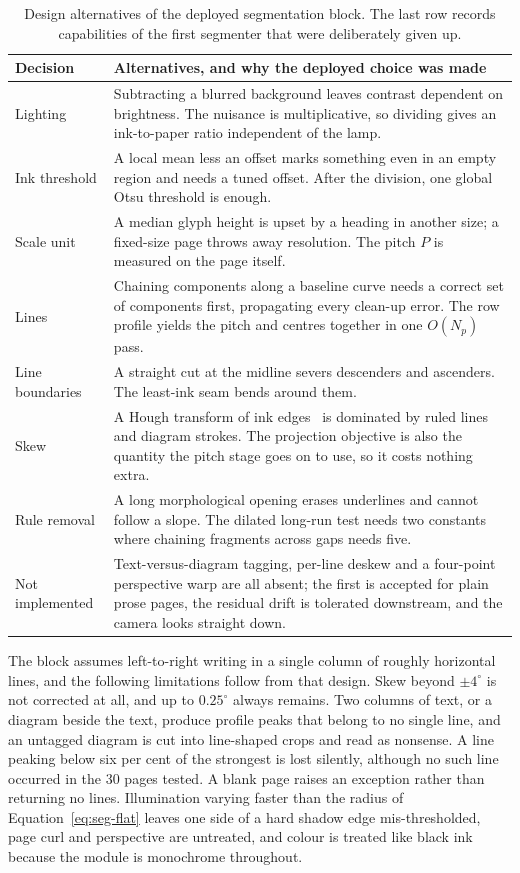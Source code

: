 \begin{table}[h]
\centering
\fontsize{8.5}{10.2}\selectfont
\setlength{\tabcolsep}{4pt}
\begin{tabularx}{\linewidth}{|p{2.4cm}|X|}
\hline
\textbf{Decision} & \textbf{Alternatives, and why the deployed choice was made} \\
\hline
Lighting & Subtracting a blurred background leaves contrast dependent on brightness. The nuisance is multiplicative, so dividing gives an ink-to-paper ratio independent of the lamp. \\
\hline
Ink threshold & A local mean less an offset marks something even in an empty region and needs a tuned offset. After the division, one global Otsu threshold is enough. \\
\hline
Scale unit & A median glyph height is upset by a heading in another size; a fixed-size page throws away resolution. The pitch $P$ is measured on the page itself. \\
\hline
Lines & Chaining components along a baseline curve needs a correct set of components first, propagating every clean-up error. The row profile yields the pitch and centres together in one $O(N_p)$ pass. \\
\hline
Line boundaries & A straight cut at the midline severs descenders and ascenders. The least-ink seam bends around them. \\
\hline
Skew & A Hough transform of ink edges~\cite{duda1972} is dominated by ruled lines and diagram strokes. The projection objective is also the quantity the pitch stage goes on to use, so it costs nothing extra. \\
\hline
Rule removal & A long morphological opening erases underlines and cannot follow a slope. The dilated long-run test needs two constants where chaining fragments across gaps needs five. \\
\hline
Not implemented & Text-versus-diagram tagging, per-line deskew and a four-point perspective warp are all absent; the first is accepted for plain prose pages, the residual drift is tolerated downstream, and the camera looks straight down. \\
\hline
\end{tabularx}
\caption{Design alternatives of the deployed segmentation block. The last row records capabilities of the first segmenter that were deliberately given up.}
\label{tab:seg-alt}
\end{table}

The block assumes left-to-right writing in a single column of roughly horizontal lines, and the following limitations follow from that design. Skew beyond $\pm4^\circ$ is not corrected at all, and up to $0.25^\circ$ always remains. Two columns of text, or a diagram beside the text, produce profile peaks that belong to no single line, and an untagged diagram is cut into line-shaped crops and read as nonsense. A line peaking below six per cent of the strongest is lost silently, although no such line occurred in the 30 pages tested. A blank page raises an exception rather than returning no lines. Illumination varying faster than the radius of Equation~\ref{eq:seg-flat} leaves one side of a hard shadow edge mis-thresholded, page curl and perspective are untreated, and colour is treated like black ink because the module is monochrome throughout.
